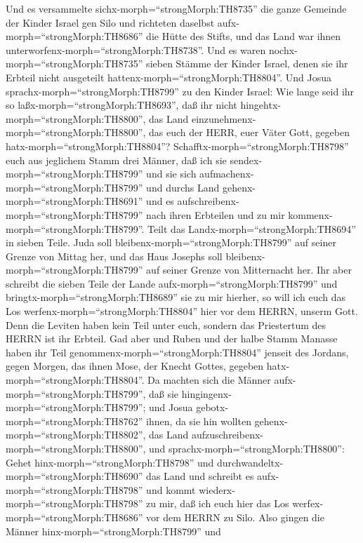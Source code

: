  Und es versammelte sichx-morph=``strongMorph:TH8735'' die
ganze Gemeinde der Kinder Israel gen Silo und richteten daselbst
aufx-morph=``strongMorph:TH8686'' die Hütte des Stifts, und das Land war
ihnen unterworfenx-morph=``strongMorph:TH8738''.  Und es
waren nochx-morph=``strongMorph:TH8735'' sieben Stämme der Kinder
Israel, denen sie ihr Erbteil nicht ausgeteilt
hattenx-morph=``strongMorph:TH8804''.  Und Josua
sprachx-morph=``strongMorph:TH8799'' zu den Kinder Israel: Wie lange
seid ihr so laßx-morph=``strongMorph:TH8693'', daß ihr nicht
hingehtx-morph=``strongMorph:TH8800'', das Land
einzunehmenx-morph=``strongMorph:TH8800'', das euch der HERR, euer Väter
Gott, gegeben hatx-morph=``strongMorph:TH8804''? 
Schafftx-morph=``strongMorph:TH8798'' euch aus jeglichem Stamm drei
Männer, daß ich sie sendex-morph=``strongMorph:TH8799'' und sie sich
aufmachenx-morph=``strongMorph:TH8799'' und durchs Land
gehenx-morph=``strongMorph:TH8691'' und es
aufschreibenx-morph=``strongMorph:TH8799'' nach ihren Erbteilen und zu
mir kommenx-morph=``strongMorph:TH8799''.  Teilt das
Landx-morph=``strongMorph:TH8694'' in sieben Teile. Juda soll
bleibenx-morph=``strongMorph:TH8799'' auf seiner Grenze von Mittag her,
und das Haus Josephs soll bleibenx-morph=``strongMorph:TH8799'' auf
seiner Grenze von Mitternacht her.  Ihr aber schreibt die
sieben Teile der Lande aufx-morph=``strongMorph:TH8799'' und
bringtx-morph=``strongMorph:TH8689'' sie zu mir hierher, so will ich
euch das Los werfenx-morph=``strongMorph:TH8804'' hier vor dem HERRN,
unserm Gott.  Denn die Leviten haben kein Teil unter euch,
sondern das Priestertum des HERRN ist ihr Erbteil. Gad aber und Ruben
und der halbe Stamm Manasse haben ihr Teil
genommenx-morph=``strongMorph:TH8804'' jenseit des Jordans, gegen
Morgen, das ihnen Mose, der Knecht Gottes, gegeben
hatx-morph=``strongMorph:TH8804''.  Da machten sich die
Männer aufx-morph=``strongMorph:TH8799'', daß sie
hingingenx-morph=``strongMorph:TH8799''; und Josua
gebotx-morph=``strongMorph:TH8762'' ihnen, da sie hin wollten
gehenx-morph=``strongMorph:TH8802'', das Land
aufzuschreibenx-morph=``strongMorph:TH8800'', und
sprachx-morph=``strongMorph:TH8800'': Gehet
hinx-morph=``strongMorph:TH8798'' und
durchwandeltx-morph=``strongMorph:TH8690'' das Land und schreibt es
aufx-morph=``strongMorph:TH8798'' und kommt
wiederx-morph=``strongMorph:TH8798'' zu mir, daß ich euch hier das Los
werfex-morph=``strongMorph:TH8686'' vor dem HERRN zu Silo. 
Also gingen die Männer hinx-morph=``strongMorph:TH8799'' und

